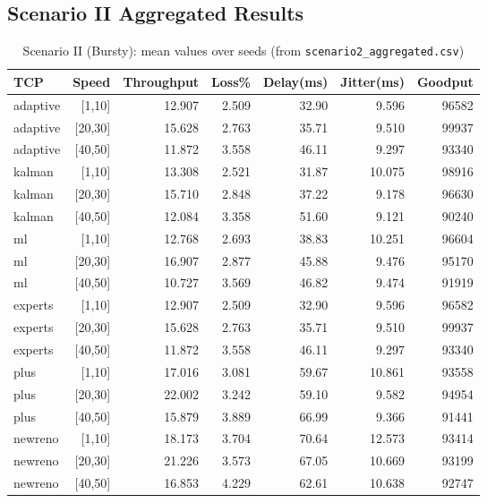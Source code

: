 \documentclass[11pt,a4paper]{article}
\begin{document}
\subsection{Scenario II Aggregated Results}
\begin{table}[H]
\centering
\small
\caption{Scenario II (Bursty): mean values over seeds (from \texttt{scenario2\_aggregated.csv})}
\begin{tabular}{lrrrrrr}
\toprule
TCP & Speed & Throughput & Loss\% & Delay(ms) & Jitter(ms) & Goodput \\
\midrule
adaptive & [1,10]  & 12.907 & 2.509 & 32.90 & 9.596 & 96582 \\
adaptive & [20,30] & 15.628 & 2.763 & 35.71 & 9.510 & 99937 \\
adaptive & [40,50] & 11.872 & 3.558 & 46.11 & 9.297 & 93340 \\
kalman   & [1,10]  & 13.308 & 2.521 & 31.87 & 10.075 & 98916 \\
kalman   & [20,30] & 15.710 & 2.848 & 37.22 & 9.178 & 96630 \\
kalman   & [40,50] & 12.084 & 3.358 & 51.60 & 9.121 & 90240 \\
ml       & [1,10]  & 12.768 & 2.693 & 38.83 & 10.251 & 96604 \\
ml       & [20,30] & 16.907 & 2.877 & 45.88 & 9.476 & 95170 \\
ml       & [40,50] & 10.727 & 3.569 & 46.82 & 9.474 & 91919 \\
experts  & [1,10]  & 12.907 & 2.509 & 32.90 & 9.596 & 96582 \\
experts  & [20,30] & 15.628 & 2.763 & 35.71 & 9.510 & 99937 \\
experts  & [40,50] & 11.872 & 3.558 & 46.11 & 9.297 & 93340 \\
plus     & [1,10]  & 17.016 & 3.081 & 59.67 & 10.861 & 93558 \\
plus     & [20,30] & 22.002 & 3.242 & 59.10 & 9.582 & 94954 \\
plus     & [40,50] & 15.879 & 3.889 & 66.99 & 9.366 & 91441 \\
newreno  & [1,10]  & 18.173 & 3.704 & 70.64 & 12.573 & 93414 \\
newreno  & [20,30] & 21.226 & 3.573 & 67.05 & 10.669 & 93199 \\
newreno  & [40,50] & 16.853 & 4.229 & 62.61 & 10.638 & 92747 \\
\bottomrule
\end{tabular}
\end{table}
\end{document}
